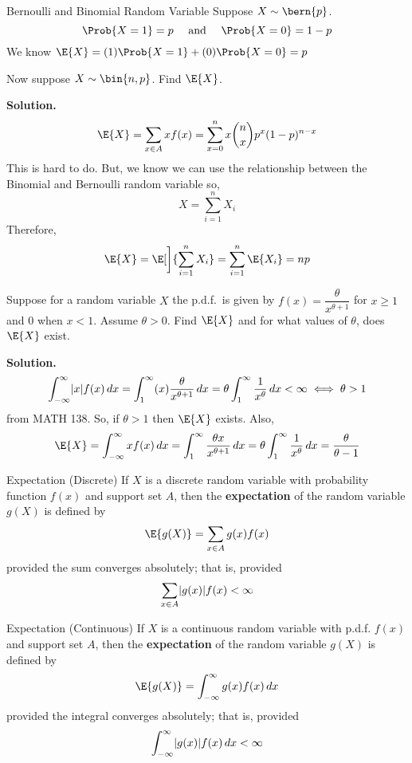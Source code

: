 \begin{Example}{Bernoulli and Binomial Random Variable}{}
    Suppose $ X \sim \bern{p} $.
    \[ \Prob{X=1}=p\quad\text{ and }\quad \Prob{X=0}=1-p \]
    We know $ \E{X}=(1)\Prob{X=1}+(0)\Prob{X=0}=p $

    Now suppose
    $ X \sim \bin{n,p} $. Find $ \E{X} $.

    \textbf{Solution.}
    \[ \E{X}=\sum\limits_{x\in A}x f(x)=\sum\limits_{x=0}^{n} x
        \binom{n}{x}p^x(1-p)^{n-x}  \]
    This is hard to do. But, we know we can use the
    relationship between the Binomial and Bernoulli random variable
    so,
    \[ X=\sum\limits_{i=1}^{n} X_i \]
    Therefore,
    \[ \E{X}=\E[\bigg]{\sum\limits_{i=1}^{n} X_i}=\sum\limits_{i=1}^{n}
        \E{X_i}=np \]
\end{Example}
\begin{Example}{}{}
    Suppose for a random variable $ X $ the p.d.f.\ is given by
    $ f(x)=\dfrac{\theta}{x^{\theta+1}} $
    for $ x\ge 1 $ and $ 0 $ when $ x<1 $. Assume $ \theta>0 $.
    Find $ \E{X} $ and for what values of $ \theta $,
    does $ \E{X} $ exist.

    \textbf{Solution.}
    \[ \int_{-\infty}^{\infty} \lvert x\rvert f(x)\, d{x}=
        \int_{1}^{\infty} (x) \frac{\theta}{x^{\theta+1}} \, d{x}
        =\theta \int_{1}^{\infty} \frac{1}{x^{\theta}} \, d{x} <\infty
        \iff \theta>1 \]
    from MATH 138. So, if $ \theta>1 $ then $ \E{X} $ exists. Also,
    \[ \E{X}=\int_{-\infty}^{\infty} xf(x)\, d{x}=
        \int_{1}^{\infty} \frac{\theta x}{x^{\theta+1}} \, d{x}
        =\theta \int_{1}^{\infty} \frac{1}{x^{\theta}} \, d{x}
        =\frac{\theta}{\theta-1}   \]

\end{Example}

\begin{Definition}{Expectation (Discrete)}{}
    If $ X $ is a discrete random variable with probability
    function $ f(x) $ and support set $ A $,
    then the \textbf{expectation} of the random variable $ g(X) $
    is defined by
    \[ \E{g(X)}=\sum\limits_{x\in A}g(x)f(x) \]
    provided the sum converges absolutely; that is, provided
    \[ \sum\limits_{x\in A}\lvert g(x)\rvert f(x)<\infty \]
\end{Definition}

\begin{Definition}{Expectation (Continuous)}{}
    If $ X $ is a continuous random variable with p.d.f.
    $ f(x) $ and support set $ A $,
    then the \textbf{expectation} of the random variable $ g(X) $
    is defined by
    \[ \E{g(X)}=\int_{-\infty}^{\infty} g(x)f(x)\, d{x} \]
    provided the integral converges absolutely; that is, provided
    \[ \int_{-\infty}^{\infty} \lvert g(x)\rvert f(x)\, d{x} <\infty \]
\end{Definition}

